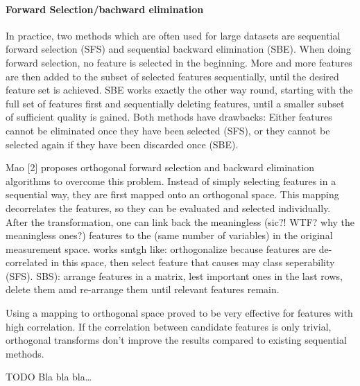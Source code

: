 \paragraph{Forward Selection/bachward elimination}
\label{par:methods.flat.wrapper.forward_selection}

In practice, two methods which are often used for large datasets are sequential forward selection (SFS) and sequential backward elimination (SBE). 
When doing forward selection, no feature is selected in the beginning. 
More and more features are then added to the subset of selected features sequentially, 
until the desired feature set is achieved. SBE works exactly the other way round, 
starting with the full set of features first and sequentially deleting features, 
until a smaller subset of sufficient quality is gained. 
Both methods have drawbacks: 
Either features cannot be eliminated once they have been selected (SFS), or they cannot be selected again if they have been discarded once (SBE).

Mao [2] proposes orthogonal forward selection and backward elimination algorithms to overcome this problem. 
Instead of simply selecting features in a sequential way, they are first mapped onto an orthogonal space. 
This mapping decorrelates the features, so they can be evaluated and selected individually. 
After the transformation, one can link back the meaningless (sic?! WTF? why the meaningless ones?) features to the (same number of variables) in the original measurement space. 
works smtgh like: orthogonalize because features are de-correlated in this space, then select feature that causes may class seperability (SFS). 
SBS): arrange features in a matrix, lest important ones in the last rows, delete them amd re-arrange them until relevant features remain.

Using a mapping to orthogonal space proved to be very effective for features with high correlation. 
If the correlation between candidate features is only trivial, orthogonal
transforms don't improve the results compared to existing sequential methods.

TODO
Bla bla bla\ldots
